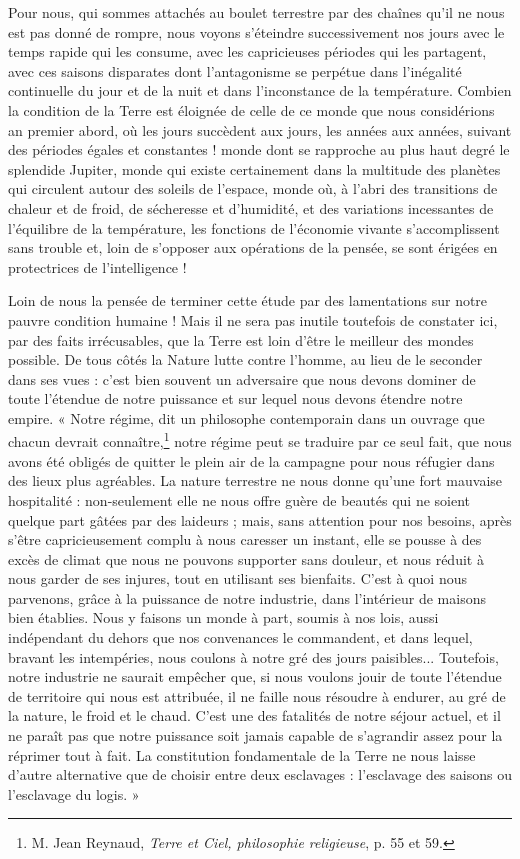 \documentclass[a4paper, 11pt, oneside]{article}
\begin{document}
Pour nous, qui sommes attachés au boulet terrestre par des chaînes qu'il ne nous est pas donné de rompre, nous voyons s'éteindre successivement nos jours avec le temps rapide qui les consume, avec les capricieuses périodes qui les partagent, avec ces saisons disparates dont l'antagonisme se perpétue dans l'inégalité continuelle du jour et de la nuit et dans l'inconstance de la température. Combien la condition de la Terre est éloignée de celle de ce monde que nous considérions an premier abord, où les jours succèdent aux jours, les années aux années, suivant des périodes égales et constantes ! monde dont se rapproche au plus haut degré le splendide Jupiter, monde qui existe certainement dans la multitude des planètes qui circulent autour des soleils de l'espace, monde où, à l'abri des transitions de chaleur et de froid, de sécheresse et d'humidité, et des variations incessantes de l'équilibre de la température, les fonctions de l'économie vivante s'accomplissent sans trouble et, loin de s'opposer aux opérations de la pensée, se sont érigées en protectrices de l'intelligence !

Loin de nous la pensée de terminer cette étude par des lamentations sur notre pauvre condition humaine ! Mais il ne sera pas inutile toutefois de constater ici, par des faits irrécusables, que la Terre est loin d'être le meilleur des mondes possible. De tous côtés la Nature lutte contre l'homme, au lieu de le seconder dans ses vues : c'est bien souvent un adversaire que nous devons dominer de toute l'étendue de notre puissance et sur lequel nous devons étendre notre empire. « Notre régime, dit un philosophe contemporain dans un ouvrage que chacun devrait connaître,\footnote{M. Jean Reynaud, \emph{Terre et Ciel, philosophie religieuse}, p. 55 et 59.} notre régime peut se traduire par ce seul fait, que nous avons été obligés de quitter le plein air de la campagne pour nous réfugier dans des lieux plus agréables. La nature terrestre ne nous donne qu'une fort mauvaise hospitalité : non-seulement elle ne nous offre guère de beautés qui ne soient quelque part gâtées par des laideurs ; mais, sans attention pour nos besoins, après s'être capricieusement complu à nous caresser un instant, elle se pousse à des excès de climat que nous ne pouvons supporter sans douleur, et nous réduit à nous garder de ses injures, tout en utilisant ses bienfaits. C'est à quoi nous parvenons, grâce à la puissance de notre industrie, dans l'intérieur de maisons bien établies. Nous y faisons un monde à part, soumis à nos lois, aussi indépendant du dehors que nos convenances le commandent, et dans lequel, bravant les intempéries, nous coulons à notre gré des jours paisibles... Toutefois, notre industrie ne saurait empêcher que, si nous voulons jouir de toute l'étendue de territoire qui nous est attribuée, il ne faille nous résoudre à endurer, au gré de la nature, le froid et le chaud. C'est une des fatalités de notre séjour actuel, et il ne paraît pas que notre puissance soit jamais capable de s'agrandir assez pour la réprimer tout à fait. La constitution fondamentale de la Terre ne nous laisse d'autre alternative que de choisir entre deux esclavages : l'esclavage des saisons ou l'esclavage du logis. »
\end{document}
